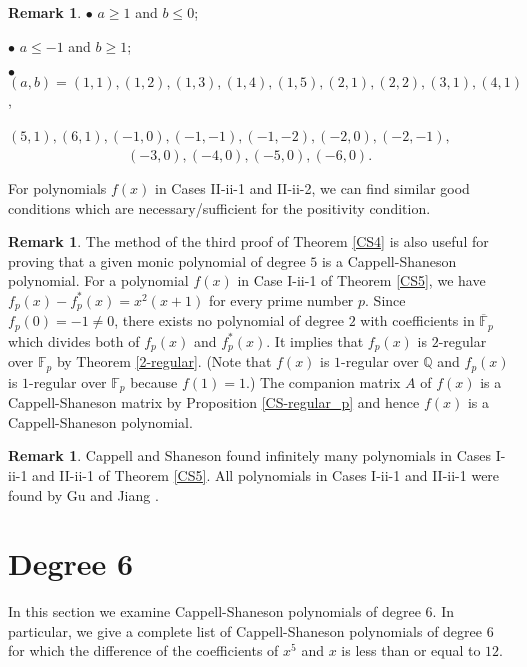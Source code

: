 \documentclass{amsart}
\theoremstyle{plain}
\theoremstyle{definition}
\newtheorem{rem}[thm]{Remark}
\theoremstyle{remark}
\begin{document}
\begin{rem}
$\bullet$ $a\geq 1$ and $b\leq 0$; 

$\bullet$ $a\leq -1$ and $b\geq 1$; 

$\bullet$ $(a,b)=(1,1), (1,2), (1,3), (1,4), (1,5), (2,1), (2,2), (3,1), (4,1)$, \\ 
\ \ \ \ \ \ \ \ \ \ \ \ \ \ \ \ \ $(5,1), (6,1), (-1,0), (-1,-1), (-1,-2), (-2,0), (-2,-1), $ \\
\ \ \ \ \ \ \ \ \ \ \ \ \ \ \ \ \ $(-3,0), (-4,0), (-5,0), (-6,0).$

For polynomials $f(x)$ in Cases II-ii-1 and II-ii-2, 
we can find similar good conditions which are necessary/sufficient for the positivity condition. 
\end{rem}

\begin{rem}
The method of the third proof of Theorem \ref{CS4} is also useful for proving 
that a given monic polynomial 
of degree $5$ is a Cappell-Shaneson polynomial. 
For a polynomial $f(x)$ in Case I-ii-1 of Theorem \ref{CS5}, 
we have $f_p(x)-f_p^*(x)=x^2(x+1)$ for every prime number $p$. 
Since $f_p(0)=-1\ne 0$, there exists no polynomial of degree $2$ with coefficients 
in $\overline{\mathbb{F}}_p$ which divides both of $f_p(x)$ and $f_p^*(x)$. 
It implies that $f_p(x)$ is $2$-regular over $\mathbb{F}_p$ by Theorem \ref{2-regular}. 
(Note that $f(x)$ is $1$-regular over $\mathbb{Q}$ and $f_p(x)$ is $1$-regular over $\mathbb{F}_p$ 
because $f(1)=1$.) 
The companion matrix $A$ of $f(x)$ is a Cappell-Shaneson matrix 
by Proposition \ref{CS-regular_p} and hence 
$f(x)$ is a Cappell-Shaneson polynomial. 
\end{rem}

\begin{rem}
Cappell and Shaneson \cite{CS1976} found infinitely many polynomials in Cases I-ii-1 and II-ii-1 
of Theorem \ref{CS5}. All polynomials in Cases I-ii-1 and II-ii-1 were found by Gu and Jiang \cite{GJ1999}. 
\end{rem}




\section{Degree 6}


In this section we examine Cappell-Shaneson polynomials of degree $6$. 
In particular, we give a complete list of Cappell-Shaneson polynomials of degree $6$ 
for which the difference of the coefficients of $x^5$ and $x$ is less than or equal to $12$. 
\end{document}
